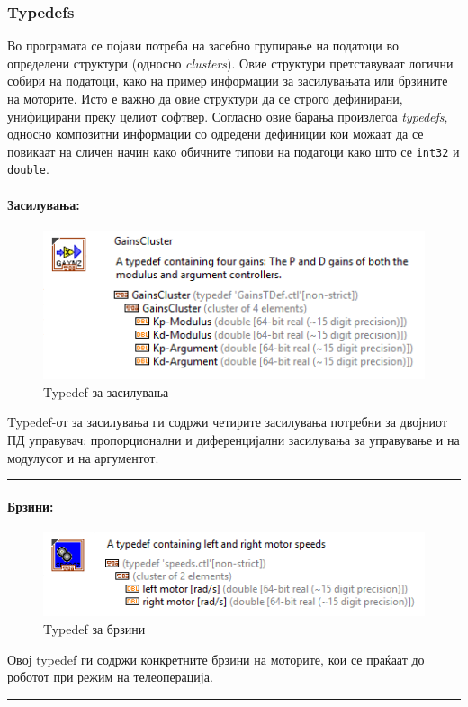 \documentclass[12pt]{article}
\begin{document}
    \subsubsection{Typedefs}
      \label{sec:typedefs}
      Во програмата се појави потреба на засебно групирање на податоци во определени структури (односно \textit{clusters}). Овие структури претставуваат логични собири на податоци, како на пример информации за засилувањата или брзините на моторите. Исто е важно да овие структури да се строго дефинирани, унифицирани преку целиот софтвер. Согласно овие барања произлегоа \textit{typedefs}, односно композитни информации со одредени дефиниции кои можаат да се повикаат на сличен начин како обичните типови на податоци како што се \verb+int32+ и \verb+double+.

      \paragraph{Засилувања:\\}
	      \begin{figure}[H]
	        \includegraphics[width=0.55\linewidth]{./images/typedef_gains_border.png}
		      \caption{Typedef за засилувања}
	        \label{fig:gain_typedef}
	        \raggedright
	        \end{figure}
        Typedef-от за засилувања ги содржи четирите засилувања потребни за двојниот ПД управувач: пропорционални и диференцијални засилувања за управување и на модулусот и на аргументот.
        \textcolor[RGB]{150,150,150}{\rule{\linewidth}{1.6pt}}

      \paragraph{Брзини:\\}
	      \begin{figure}[H]
	        \includegraphics[width=0.55\linewidth]{./images/typedef_speeds_border.png}
		      \caption{Typedef за брзини}
	        \label{fig:gain_typedef}
	        \raggedright
	        \end{figure}
	      Овој typedef ги содржи конкретните брзини на моторите, кои се праќаат до роботот при режим на телеоперација.
        \textcolor[RGB]{150,150,150}{\rule{\linewidth}{1.6pt}}
\end{document}
